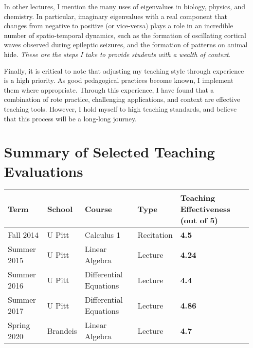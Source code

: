 \documentclass[a4paper,11pt]{article}
\begin{document}
In other lectures, I mention the many uses of eigenvalues in biology, physics, and chemistry. In particular, imaginary eigenvalues with a real component that changes from negative to positive (or vice-versa) plays a role in an incredible number of spatio-temporal dynamics, such as the formation of oscillating cortical waves observed during epileptic seizures, and the formation of patterns on animal hide. \textit{These are the steps I take to provide students with a wealth of context}.

Finally, it is critical to note that adjusting my teaching style through experience is a high priority. As good pedagogical practices become known, I implement them where appropriate. Through this experience, I have found that a combination of rote practice, challenging applications, and context are effective teaching tools. However, I hold myself to high teaching standards, and believe that this process will be a long-long journey.


\section{Summary of Selected Teaching Evaluations}

\begin{tabular}{lllll}
	Term & School & Course & Type & \textbf{Teaching Effectiveness (out of 5)}\\
	\hline
	Fall 2014 &U Pitt & Calculus 1 & Recitation &  \textbf{4.5}\\
	Summer 2015 &U Pitt & Linear Algebra & Lecture &  \textbf{4.24}\\
	Summer 2016 &U Pitt & Differential Equations & Lecture &  \textbf{4.4}\\
	Summer 2017 &U Pitt & Differential Equations & Lecture &  \textbf{4.86}\\
	Spring 2020 &Brandeis & Linear Algebra & Lecture &  \textbf{4.7}\\
\end{tabular}
 
\end{document}
